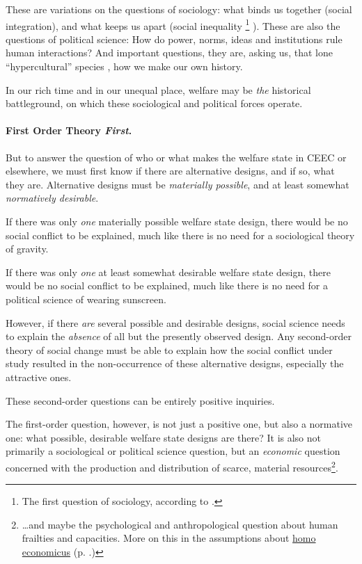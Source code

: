 \documentclass[11pt,a4paper,oneside,openright]{article}
\begin{document}
These are variations on the questions of sociology: 
what binds us together (social integration), and what keeps us apart (social inequality
\footnote{
	The first question of sociology, according to \citep[66]{Dahrendorf1966}.
}
). 
These are also the questions of political science: 
How do power, norms, ideas and institutions rule human interactions? 
And important questions, they are, asking us, that lone ``hypercultural'' species \citep{Henrich2004}, how we make our own history. 

In our rich time and in our unequal place, welfare may be \emph{the} historical battleground, on which these sociological and political forces operate. 

\paragraph{First Order Theory \emph{First}.}
But to answer the question of who or what makes the welfare state in \gls{CEEC} or elsewhere, we must first know if there are alternative designs, and if so, what they are. 
Alternative designs must be \emph{materially possible}, and at least somewhat \emph{normatively desirable}.

If there was only \emph{one} materially possible welfare state design, there would be no social conflict to be explained, much like there is no need for a sociological theory of gravity. 

If there was only \emph{one} at least somewhat desirable welfare state design, there would be no social conflict to be explained, much like there is no need for a political science of wearing sunscreen.

However, if there \emph{are} several possible and desirable designs, social science needs to explain the \emph{absence} of all but the presently observed design. 
Any second-order theory of social change must be able to explain how the social conflict under study resulted in the non-occurrence of these alternative designs, especially the attractive ones. 

These second-order questions can be entirely positive inquiries.

The first-order question, however, is not just a positive one, but also a normative one: 
what possible, desirable welfare state designs are there? 
It is also not primarily a sociological or political science question, but an \emph{economic} question concerned with the production and distribution of scarce, material resources\footnote{
	\ldots and maybe the psychological and anthropological question about human frailties and capacities. More on this in the assumptions about \hyperref[it:homo_economicus]{homo economicus} (p. \pageref{it:homo_economicus}.)
}.
\end{document}
